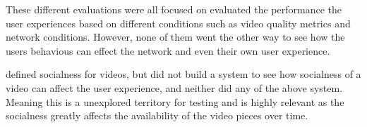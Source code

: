 These different evaluations were all focused on evaluated the performance the user experiences based on different conditions such as video quality metrics and network conditions. However, none of them went the other way to see how the users behavious can effect the network and even their own user experience.

\citeauthor{broxton2013catching} \cite{broxton2013catching} defined socialness for videos, but did not build a system to see how socialness of a video can affect the user experience, and neither did any of the above system. Meaning this is a unexplored territory for testing and is highly relevant as the socialness greatly affects the availability of the video pieces over time.


